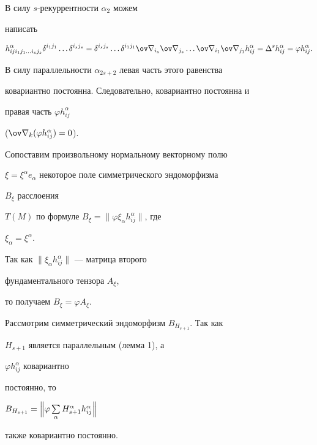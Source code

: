 \begin{pf} В силу $s$-рекуррентности $\alpha_2$ можем


написать


\begin{equation}


h^\alpha_{i j i_1 j_1\dots i_s j_s}\delta^{i_1 j_1}\dots


\delta^{i_s j_s}= \delta^{i_s j_s}\dots\delta^{i_1 j_1}


\ov\nabla_{i_s}\ov\nabla_{j_s}\dots\ov\nabla_{i_1}


\ov\nabla_{j_1}h^\alpha_{ij}=\Delta^s h^\alpha_{ij}=


\varphi h^\alpha_{ij}.


\end{equation}


В силу параллельности $\alpha_{2s+2}$ левая часть этого равенства


ковариантно постоянна. Следовательно, ковариантно постоянна и


правая часть $\varphi h^\alpha_{ij}$


($\ov\nabla_k(\varphi h^\alpha_{ij})=0$).





Сопоставим произвольному нормальному векторному полю


$\xi=\xi^\alpha e_\alpha$ некоторое поле симметрического эндоморфизма


$B_\xi$ расслоения


$T(M)$ по формуле $B_\xi=\|\varphi\xi_\alpha h^\alpha_{ij}\|$, где


$\xi_\alpha=\xi^\alpha$.


Так как $\|\xi_\alpha h^\alpha_{ij}\|$ --- матрица второго


фундаментального тензора $A_\xi$,


то получаем $B_\xi=\varphi A_\xi$.





Рассмотрим симметрический эндоморфизм $B_{H_{s+1}}$. Так как


$H_{s+1}$ является параллельным (лемма 1), а


$\varphi h^\alpha_{ij}$ ковариантно


постоянно, то


$B_{H_{s+1}}=\Bigl\|\varphi\sum\limits_\alpha H^\alpha_{s+1}


h^\alpha_{ij}\Bigr\|$


также ковариантно постоянно.






\end{pf}
